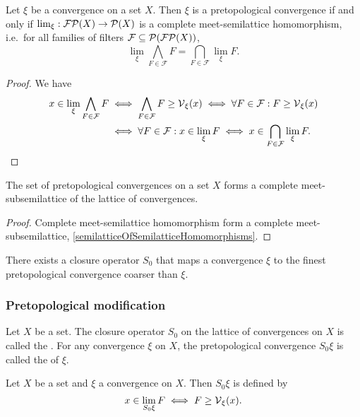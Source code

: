 \begin{proposition}
Let $\xi$ be a convergence on a set $X$. Then $\xi$ is a pretopological convergence \textup{if and only if} $\lim_\xi: \operatorname{\mathcal{FP}}(X)\to \operatorname{\mathcal{P}}(X)$ is a complete meet-semilattice homomorphism, i.e.\
for all families of filters $\mathcal{F} \subseteq \operatorname{\mathcal{P}}(\operatorname{\mathcal{FP}}(X))$,
\[ \lim_\xi \bigwedge_{F\in \mathcal{F}}F = \bigcap_{F\in\mathcal{F}}\lim_\xi F. \] 
\end{proposition}
\begin{proof}
We have
\begin{align*}
x\in \lim_\xi \bigwedge_{F\in \mathcal{F}}F &\iff \bigwedge_{F\in \mathcal{F}}F \geq \operatorname{\mathcal{V}}_\xi(x) \iff \forall F\in\mathcal{F}: F\geq \operatorname{\mathcal{V}}_\xi(x) \\
&\iff \forall F\in \mathcal{F}: x\in\lim_\xi F \iff x\in \bigcap_{F\in\mathcal{F}}\lim_\xi F.
\end{align*}
\end{proof}
\begin{corollary}
The set of pretopological convergences on a set $X$ forms a complete meet-subsemilattice of the lattice of convergences.
\end{corollary}
\begin{proof}
Complete meet-semilattice homomorphism form a complete meet-subsemilattice, \ref{semilatticeOfSemilatticeHomomorphisms}.
\end{proof}
\begin{corollary}
There exists a closure operator $S_0$ that maps a convergence $\xi$ to the finest pretopological convergence coarser than $\xi$.
\end{corollary}

\subsubsection{Pretopological modification}
\begin{definition}
Let $X$ be a set. The closure operator $S_0$ on the lattice of convergences on $X$ is called the . For any convergence $\xi$ on $X$, the pretopological convergence $S_0\xi$ is called the  of $\xi$.
\end{definition}

\begin{proposition}
Let $X$ be a set and $\xi$ a convergence on $X$. Then $S_0\xi$ is defined by
\[ x\in \lim_{S_0\xi} F \iff F \geq \operatorname{\mathcal{V}}_\xi(x). \]
\end{proposition}

